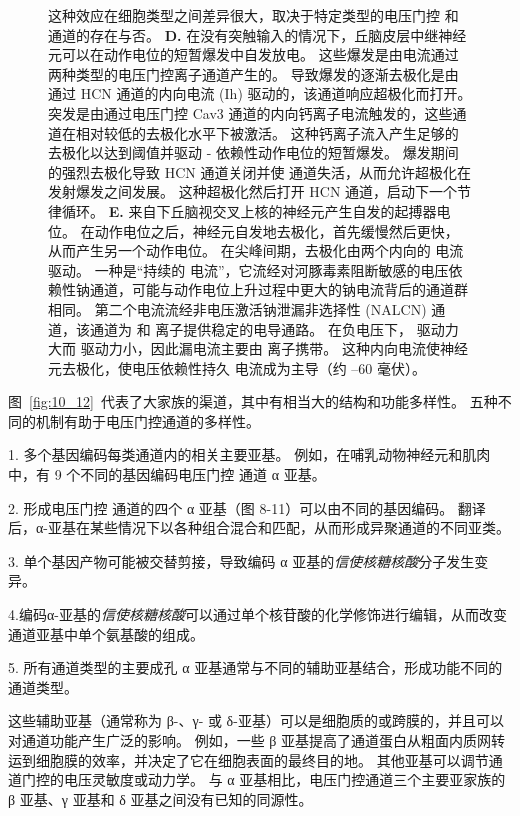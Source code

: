 \begin{figure}[htbp]
{		这种效应在细胞类型之间差异很大，取决于特定类型的电压门控  和  通道的存在与否。
		\textbf{D.} 在没有突触输入的情况下，丘脑皮层中继神经元可以在动作电位的短暂爆发中自发放电。
		这些爆发是由电流通过两种类型的电压门控离子通道产生的。
		导致爆发的逐渐去极化是由通过 HCN 通道的内向电流 (Ih) 驱动的，该通道响应超极化而打开。
		突发是由通过电压门控 Cav3 通道的内向钙离子电流触发的，这些通道在相对较低的去极化水平下被激活。
		这种钙离子流入产生足够的去极化以达到阈值并驱动 - 依赖性动作电位的短暂爆发。
		爆发期间的强烈去极化导致 HCN 通道关闭并使  通道失活，从而允许超极化在发射爆发之间发展。
		这种超极化然后打开 HCN 通道，启动下一个节律循环\cite{mccormick1992model}。 
		\textbf{E.} 来自下丘脑视交叉上核的神经元产生自发的起搏器电位。
		在动作电位之后，神经元自发地去极化，首先缓慢然后更快，从而产生另一个动作电位。
		在尖峰间期，去极化由两个内向的  电流驱动。
		一种是“持续的  电流”，它流经对河豚毒素阻断敏感的电压依赖性钠通道，可能与动作电位上升过程中更大的钠电流背后的通道群相同。
		第二个电流流经非电压激活钠泄漏非选择性 (NALCN) 通道，该通道为  和  离子提供稳定的电导通路。
		在负电压下， 驱动力大而  驱动力小，因此漏电流主要由  离子携带。
		这种内向电流使神经元去极化，使电压依赖性持久  电流成为主导（约 –60 毫伏）\cite{jackson2004mechanism}。}
	\label{fig:10_15}
\end{figure}


图~\ref{fig:10_12}~代表了大家族的渠道，其中有相当大的结构和功能多样性。
五种不同的机制有助于电压门控通道的多样性。


1. 多个基因编码每类通道内的相关主要亚基。
例如，在哺乳动物神经元和肌肉中，有 9 个不同的基因编码电压门控  通道 α 亚基。


2. 形成电压门控  通道的四个 α 亚基（图 8-11）可以由不同的基因编码。
翻译后，α-亚基在某些情况下以各种组合混合和匹配，从而形成异聚通道的不同亚类。 


3. 单个基因产物可能被交替剪接，导致编码 α 亚基的\textit{信使核糖核酸}分子发生变异。


4.编码α-亚基的\textit{信使核糖核酸}可以通过单个核苷酸的化学修饰进行编辑，从而改变通道亚基中单个氨基酸的组成。 


5. 所有通道类型的主要成孔 α 亚基通常与不同的辅助亚基结合，形成功能不同的通道类型。


这些辅助亚基（通常称为 β-、γ- 或 δ-亚基）可以是细胞质的或跨膜的，并且可以对通道功能产生广泛的影响。
例如，一些 β 亚基提高了通道蛋白从粗面内质网转运到细胞膜的效率，并决定了它在细胞表面的最终目的地。
其他亚基可以调节通道门控的电压灵敏度或动力学。
与 α 亚基相比，电压门控通道三个主要亚家族的 β 亚基、γ 亚基和 δ 亚基之间没有已知的同源性。


